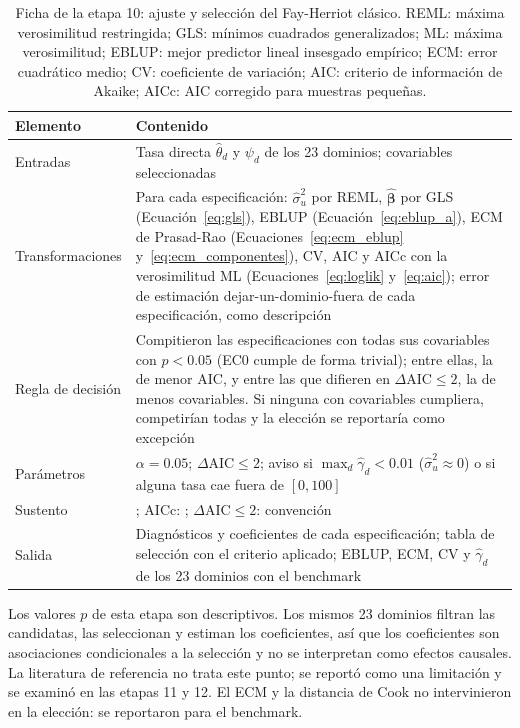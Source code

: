 \begin{table}[!htbp]
\centering
\small
\caption[Ficha de la etapa 10: ajuste y selección del Fay-Herriot clásico]{Ficha de la etapa 10: ajuste y selección del Fay-Herriot clásico. REML: máxima verosimilitud restringida; GLS: mínimos cuadrados generalizados; ML: máxima verosimilitud; EBLUP: mejor predictor lineal insesgado empírico; ECM: error cuadrático medio; CV: coeficiente de variación; AIC: criterio de información de Akaike; AICc: AIC corregido para muestras pequeñas.}
\label{tab:met_fh_clasico}
\renewcommand{\arraystretch}{1.15}
\begin{tabularx}{\linewidth}{>{\raggedright\arraybackslash}p{2.8cm} >{\raggedright\arraybackslash}X}
\toprule
Elemento & Contenido \\
\midrule
Entradas & Tasa directa $\hat{\theta}_d$ y $\psi_d$ de los 23 dominios; covariables seleccionadas \\
Transformaciones & Para cada especificación: $\hat{\sigma}_u^2$ por REML, $\hat{\boldsymbol{\beta}}$ por GLS (Ecuación~\ref{eq:gls}), EBLUP (Ecuación~\ref{eq:eblup_a}), ECM de Prasad-Rao (Ecuaciones~\ref{eq:ecm_eblup} y~\ref{eq:ecm_componentes}), CV, AIC y AICc con la verosimilitud ML (Ecuaciones~\ref{eq:loglik} y~\ref{eq:aic}); error de estimación dejar-un-dominio-fuera de cada especificación, como descripción \\
Regla de decisión & Compitieron las especificaciones con todas sus covariables con $p < 0.05$ (EC0 cumple de forma trivial); entre ellas, la de menor AIC, y entre las que difieren en $\Delta\text{AIC} \leq 2$, la de menos covariables. Si ninguna con covariables cumpliera, competirían todas y la elección se reportaría como excepción \\
Parámetros & $\alpha = 0.05$; $\Delta\text{AIC} \leq 2$; aviso si $\max_d \hat{\gamma}_d < 0.01$ ($\hat{\sigma}_u^2 \approx 0$) o si alguna tasa cae fuera de $[0, 100]$ \\
Sustento & \cite[pp.~427, 434--441, 453--454]{morales2021smallarea}; AICc: \cite{HurvichTsai1989}; $\Delta\text{AIC} \leq 2$: convención \\
Salida & Diagnósticos y coeficientes de cada especificación; tabla de selección con el criterio aplicado; EBLUP, ECM, CV y $\hat{\gamma}_d$ de los 23 dominios con el benchmark \\
\bottomrule
\end{tabularx}
\end{table}

Los valores $p$ de esta etapa son descriptivos. Los mismos 23 dominios filtran las candidatas, las seleccionan y estiman los coeficientes, así que los coeficientes son asociaciones condicionales a la selección y no se interpretan como efectos causales. La literatura de referencia no trata este punto; se reportó como una limitación y se examinó en las etapas 11 y 12. El ECM y la distancia de Cook no intervinieron en la elección: se reportaron para el benchmark.

